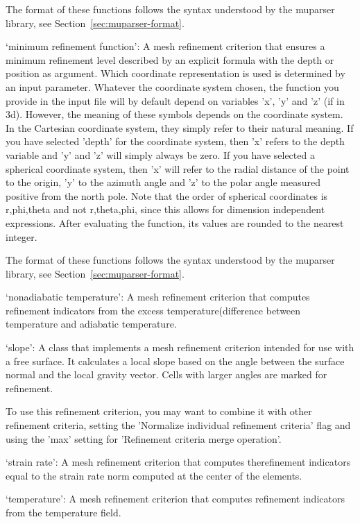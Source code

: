 \begin{itemize}
The format of these functions follows the syntax understood by the muparser library, see Section~\ref{sec:muparser-format}.

`minimum refinement function': A mesh refinement criterion that ensures a minimum refinement level described by an explicit formula with the depth or position as argument. Which coordinate representation is used is determined by an input parameter. Whatever the coordinate system chosen, the function you provide in the input file will by default depend on variables 'x', 'y' and 'z' (if in 3d). However, the meaning of these symbols depends on the coordinate system. In the Cartesian coordinate system, they simply refer to their natural meaning. If you have selected 'depth' for the coordinate system, then 'x' refers to the depth variable and 'y' and 'z' will simply always be zero. If you have selected a spherical coordinate system, then 'x' will refer to the radial distance of the point to the origin, 'y' to the azimuth angle and 'z' to the polar angle measured positive from the north pole. Note that the order of spherical coordinates is r,phi,theta and not r,theta,phi, since this allows for dimension independent expressions. After evaluating the function, its values are rounded to the nearest integer.

The format of these functions follows the syntax understood by the muparser library, see Section~\ref{sec:muparser-format}.

`nonadiabatic temperature': A mesh refinement criterion that computes refinement indicators from the excess temperature(difference between temperature and adiabatic temperature.

`slope': A class that implements a mesh refinement criterion intended for use with a free surface. It calculates a local slope based on the angle between the surface normal and the local gravity vector. Cells with larger angles are marked for refinement.

To use this refinement criterion, you may want to combine it with other refinement criteria, setting the 'Normalize individual refinement criteria' flag and using the 'max' setting for 'Refinement criteria merge operation'.

`strain rate': A mesh refinement criterion that computes therefinement indicators equal to the strain rate norm computed at the center of the elements.

`temperature': A mesh refinement criterion that computes refinement indicators from the temperature field.


\end{itemize}

